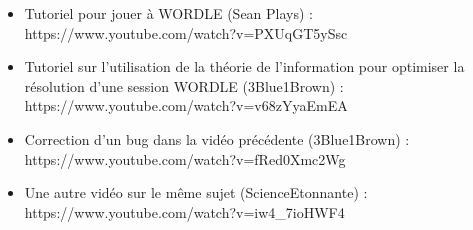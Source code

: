 \documentclass{article}
\begin{document}
\begin{itemize}
    \item Tutoriel pour jouer à WORDLE (Sean Plays) : https://www.youtube.com/watch?v=PXUqGT5ySsc
    \item Tutoriel sur l’utilisation de la théorie de l’information pour optimiser la résolution d’une session
    WORDLE (3Blue1Brown) : https://www.youtube.com/watch?v=v68zYyaEmEA
    \item Correction d'un bug dans la vidéo précédente (3Blue1Brown) : https://www.youtube.com/watch?v=fRed0Xmc2Wg
    \item Une autre vidéo sur le même sujet (ScienceEtonnante) : https://www.youtube.com/watch?v=iw4\_7ioHWF4
\end{itemize}
\end{document}
